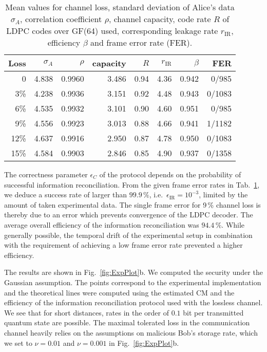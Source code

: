 \documentclass[aps,amsfonts,twoside,amssymb,superscriptaddress,twocolumn]{revtex4-1}
\newcommand*{\ec}{\textrm{IR}}
\begin{document}
\begin{table}[h]
	\begin{tabular}{r|r|r|r|r|r|r|r}
		Loss & $\sigma_A$ & $\rho$ & capacity & $R$ & $r_\ec$ & $\beta$ & FER \\
		\hline
		0 & 4.838 & 0.9960 & 3.486 & 0.94 & 4.36 & 0.942 & 0/985\\
		3\% & 4.238 & 0.9936 & 3.151& 0.92 & 4.48 & 0.943 & 0/1083\\
		6\% & 4.535 & 0.9932 & 3.101 & 0.90 & 4.60 & 0.951 & 0/985\\
		9\% & 4.556 & 0.9923 & 3.013 & 0.88 & 4.66 & 0.941 & 1/1182\\
		12\% & 4.637 & 0.9916 & 2.950 & 0.87 & 4.78 & 0.950 & 0/1083\\
		15\% & 4.584 & 0.9903 & 2.846 & 0.85 & 4.90 & 0.937 & 0/1358\\
	\end{tabular}
	\caption{Mean values for channel loss, standard deviation of Alice's data $\sigma_A$, correlation coefficient $\rho$, channel capacity, code rate $R$ of LDPC codes over GF(64) used, corresponding leakage rate $r_\ec$, efficiency $\beta$ and frame error rate (FER). \label{table:code-rates}}
\end{table}


The correctness parameter $\epsilon_C$ of the protocol depends on the probability of successful information reconciliation. From the given frame error rates in Tab.~\ref{table:code-rates}, we deduce a success rate of larger than $99.9\,\%$, i.e.\ $\epsilon_\text{IR} = 10^{-3}$, limited by the amount of taken experimental data. The single frame error for 9\,\% channel loss is thereby due to an error which prevents convergence of the LDPC decoder.  The average overall efficiency of the information reconciliation was $94.4\,\%$. While generally possible, the temporal drift of the experimental setup in combination with the requirement of achieving a low frame error rate prevented a higher efficiency. 

The results are shown in Fig.~\ref{fig:ExpPlot}b. We computed the security under the Gaussian assumption. The points correspond to the experimental implementation and the theoretical lines were computed using the estimated CM and the efficiency of the information reconciliation protocol used with the lossless channel. We see that for short distances, rates in the order of $0.1$ bit per transmitted quantum state are possible. The maximal tolerated loss in the communication channel heavily relies on the assumptions on malicious Bob's storage rate, which we set to $\nu=0.01$ and $\nu=0.001$ in Fig.~\ref{fig:ExpPlot}b.
\end{document}
